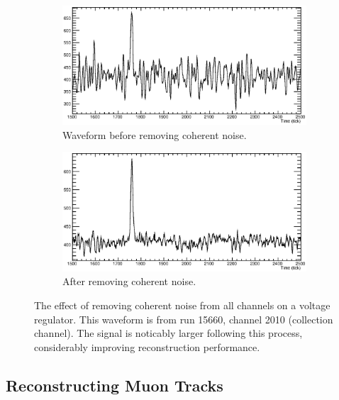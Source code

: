 \begin{figure}[ht]
  \centering
  \begin{subfigure}[t]{0.48\linewidth}
    \centering
    \includegraphics[width=\textwidth]{raw_noise.eps}
    \caption{Waveform before removing coherent noise.}
    \label{fig:CoherentNoiseRemovalNoise}
  \end{subfigure}
  \hfill
  \begin{subfigure}[t]{0.48\linewidth}
    \centering
    \includegraphics[width=\textwidth]{raw_nonoise.eps}
    \caption{After removing coherent noise.}
    \label{fig:CoherentNoiseRemovalNoNoise}
  \end{subfigure}
  \caption[Coherent noise removal in 35~ton data]{The effect of removing coherent noise from all channels on a voltage regulator.  This waveform is from run 15660, channel 2010 (collection channel).  The signal is noticably larger following this process, considerably improving reconstruction performance.}
  \label{fig:CoherentNoiseRemoval}
\end{figure}

\subsection{Reconstructing Muon Tracks}\label{sec:ReconstructingMuonTracks}

